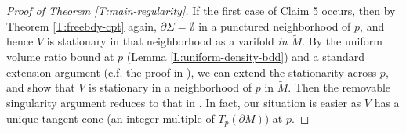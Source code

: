 \documentclass[10pt]{amsart}
\theoremstyle{definition}
\theoremstyle{remark}
\numberwithin{equation}{section}
\newcommand{\Si}{\Sigma}
\newcommand{\tM}{\widetilde{M}}
\begin{document}
\begin{proof}[Proof of Theorem \ref{T:main-regularity}]
\vspace{0.3cm}



If the first case of Claim 5 occurs, then by Theorem \ref{T:freebdy-cpt} again, $\partial \Si = \emptyset$ in a punctured neighborhood of $p$, and hence $V$ is stationary in that neighborhood as a varifold \emph{in $\tM$}. By the uniform volume ratio bound at $p$ (Lemma \ref{L:uniform-density-bdd}) and a standard extension argument (c.f. the proof in \cite[Theorem 4.1]{Harvey-Lawson}), we can extend the stationarity across $p$, and show that $V$ is stationary in a neighborhood of $p$ in $\tM$. Then the removable singularity argument reduces to that in \cite[Theorem 7.12]{Pitts}. In fact, our situation is easier as $V$ has a unique tangent cone (an integer multiple of $T_p(\partial M)$) at $p$.



\end{proof}
\end{document}
